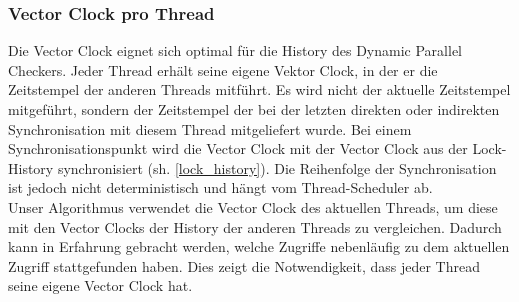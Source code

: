 \documentclass[10pt,a4paper]{article}
\begin{document}
\subsubsection{Vector Clock pro Thread}
Die Vector Clock eignet sich optimal für die History des Dynamic Parallel Checkers. Jeder Thread erhält seine eigene Vektor Clock, in der er die Zeitstempel der anderen Threads mitführt. Es wird nicht der aktuelle Zeitstempel mitgeführt, sondern der Zeitstempel der bei der letzten direkten oder indirekten Synchronisation mit diesem Thread mitgeliefert wurde. Bei einem Synchronisationspunkt wird die Vector Clock mit der Vector Clock aus der Lock-History synchronisiert (sh. \ref{lock_history}). Die Reihenfolge der Synchronisation ist jedoch nicht deterministisch und hängt vom Thread-Scheduler ab.\\
Unser Algorithmus verwendet die Vector Clock des aktuellen Threads, um diese mit den Vector Clocks der History der anderen Threads zu vergleichen. Dadurch kann in Erfahrung gebracht werden, welche Zugriffe nebenläufig zu dem aktuellen Zugriff stattgefunden haben. Dies zeigt die Notwendigkeit, dass jeder Thread seine eigene Vector Clock hat.
\end{document}
